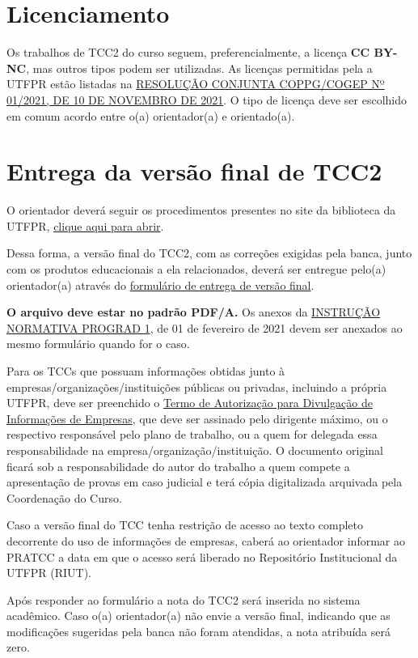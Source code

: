 \documentclass[a4paper, 12pt]{article}
\begin{document}
	\section{Licenciamento}
	
	Os trabalhos de TCC2 do curso seguem, preferencialmente, a licença \textbf{CC BY-NC}, mas outros tipos podem ser utilizadas. As licenças permitidas pela a UTFPR estão listadas na \href{https://sei.utfpr.edu.br/sei/publicacoes/controlador_publicacoes.php?acao=publicacao_visualizar&id_documento=2615190&id_orgao_publicacao=0}{RESOLUÇÃO CONJUNTA COPPG/COGEP Nº 01/2021, DE 10 DE NOVEMBRO DE 2021}. O tipo de licença deve ser escolhido em comum acordo entre o(a) orientador(a) e orientado(a).
	
	\section{Entrega da versão final de TCC2}
	
	O orientador deverá seguir os procedimentos presentes no site da biblioteca da UTFPR, \href{http://portal.utfpr.edu.br/biblioteca/trabalhos-academicos/docentes/procedimento-de-entrega-graduacao}{clique aqui para abrir}.
	
	Dessa forma, a versão final do TCC2, com as correções exigidas pela banca, junto com os produtos educacionais a ela relacionados, deverá ser entregue pelo(a) orientador(a) através do \href{https://forms.gle/LScHkAtDPReTjki46}{formulário de entrega de versão final}. 
	
	\textbf{O arquivo deve estar no padrão PDF/A.} Os anexos da \href{https://sei.utfpr.edu.br/sei/publicacoes/controlador_publicacoes.php?acao=publicacao_visualizar&id_documento=2042165&id_orgao_publicacao=0}{INSTRUÇÃO NORMATIVA PROGRAD 1}, de 01 de fevereiro de 2021 devem ser anexados ao mesmo formulário quando for o caso. 

    Para os TCCs que possuam informações obtidas junto à empresas/organizações/instituições públicas ou privadas, incluindo a própria UTFPR, deve ser preenchido o \href{https://sei.utfpr.edu.br/sei/publicacoes/controlador_publicacoes.php?acao=publicacao_visualizar&id_documento=2651593&id_orgao_publicacao=0}{Termo de Autorização para Divulgação de Informações de Empresas}, que deve ser assinado pelo dirigente máximo, ou o respectivo responsável pelo plano de trabalho, ou a quem for delegada essa responsabilidade na empresa/organização/instituição. O documento original ficará sob a responsabilidade do autor do trabalho a quem compete a apresentação de provas em caso judicial e terá cópia digitalizada arquivada pela Coordenação do Curso.

	Caso a versão final do TCC tenha restrição de acesso ao texto completo decorrente do uso de informações de empresas, caberá ao orientador informar ao PRATCC a data em que o acesso será liberado no Repositório Institucional da UTFPR (RIUT).
		
	Após responder ao formulário a nota do TCC2 será inserida no sistema acadêmico. Caso o(a) orientador(a) não envie a versão final, indicando que as modificações sugeridas pela banca não foram atendidas, a nota atribuída será zero.
\end{document}
